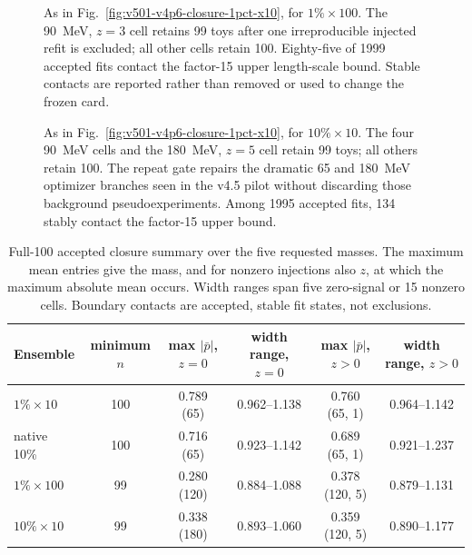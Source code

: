\begin{figure}[p]
\centering
{}
\caption{As in Fig.~\ref{fig:v501-v4p6-closure-1pct-x10}, for $1\%\times100$.  The
90~MeV, $z=3$ cell retains 99 toys after one irreproducible injected refit is excluded;
all other cells retain 100.  Eighty-five of 1999 accepted fits contact the factor-15
upper length-scale bound.  Stable contacts are reported rather than removed or used to
change the frozen card.}
\label{fig:v501-v4p6-closure-1pct-x100}
\end{figure}

\begin{figure}[p]
\centering
{}
\caption{As in Fig.~\ref{fig:v501-v4p6-closure-1pct-x10}, for $10\%\times10$.  The four
90~MeV cells and the 180~MeV, $z=5$ cell retain 99 toys; all others retain 100.  The
repeat gate repairs the dramatic 65 and 180~MeV optimizer branches seen in the v4.5
pilot without discarding those background pseudoexperiments.  Among 1995 accepted
fits, 134 stably contact the factor-15 upper bound.}
\label{fig:v501-v4p6-closure-10pct-x10}
\end{figure}

\clearpage
\begin{table}[H]
\centering
\small
\caption{Full-100 accepted closure summary over the five requested masses.  The
maximum mean entries give the mass, and for nonzero injections also $z$, at which the
maximum absolute mean occurs.  Width ranges span five zero-signal or 15 nonzero cells.
Boundary contacts are accepted, stable fit states, not exclusions.}
\label{tab:v501-v4p6-refmatched-summary}
\begin{tabular}{lccccc}
\toprule
Ensemble & minimum $n$ & max $|\bar p|$, $z=0$ & width range, $z=0$ &
max $|\bar p|$, $z>0$ & width range, $z>0$ \\
\midrule
$1\%\times10$  & 100 & 0.789 (65)  & 0.962--1.138 & 0.760 (65, 1)  & 0.964--1.142 \\
native 10\%     & 100 & 0.716 (65)  & 0.923--1.142 & 0.689 (65, 1)  & 0.921--1.237 \\
$1\%\times100$ &  99 & 0.280 (120) & 0.884--1.088 & 0.378 (120, 5) & 0.879--1.131 \\
$10\%\times10$ &  99 & 0.338 (180) & 0.893--1.060 & 0.359 (120, 5) & 0.890--1.177 \\
\bottomrule
\end{tabular}
\end{table}

